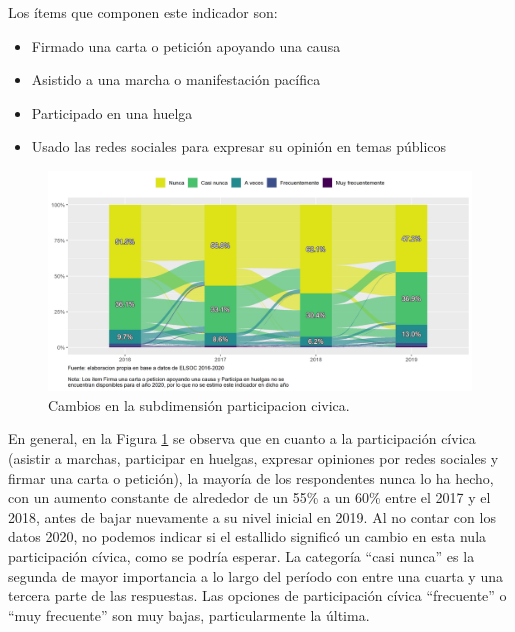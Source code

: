 \documentclass[
  12pt,
]{book}
\begin{document}
Los ítems que componen este indicador son:

\begin{itemize}
\item
  Firmado una carta o petición apoyando una causa
\item
  Asistido a una marcha o manifestación pacífica
\item
  Participado en una huelga
\item
  Usado las redes sociales para expresar su opinión en temas públicos
\end{itemize}

\begin{figure}[H]

{\centering \includegraphics[width=1\linewidth,height=1\textheight]{output/graphs/alluvial_participacion} 

}

\caption{Cambios en la subdimensión participacion civica.}\label{fig:alluvial-participacion}
\end{figure}

En general, en la Figura \ref{fig:alluvial-participacion} se observa que en cuanto a la participación cívica (asistir a marchas, participar en huelgas, expresar opiniones por redes sociales y firmar una carta o petición), la mayoría de los respondentes nunca lo ha hecho, con un aumento constante de alrededor de un 55\% a un 60\% entre el 2017 y el 2018, antes de bajar nuevamente a su nivel inicial en 2019. Al no contar con los datos 2020, no podemos indicar si el estallido significó un cambio en esta nula participación cívica, como se podría esperar. La categoría ``casi nunca'' es la segunda de mayor importancia a lo largo del período con entre una cuarta y una tercera parte de las respuestas. Las opciones de participación cívica ``frecuente'' o ``muy frecuente'' son muy bajas, particularmente la última.
\end{document}
